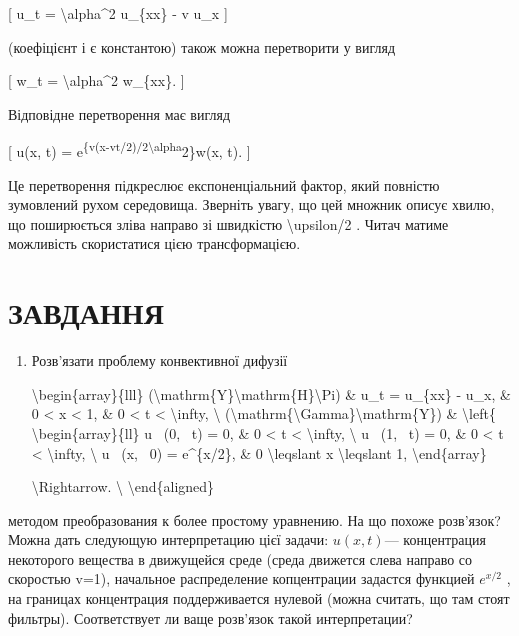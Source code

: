 \documentclass[
]{article}
\begin{document}
{[} u\_t = \textbackslash alpha\^{}2 u\_\{xx\} - v u\_x {]}

(коефіцієнт і є константою) також можна перетворити у вигляд

{[} w\_t = \textbackslash alpha\^{}2 w\_\{xx\}. {]}

Відповідне перетворення має вигляд

{[} u(x, t) =
e\textsuperscript{\{v(x-vt/2)/2\textbackslash alpha}2\}w(x, t). {]}

Це перетворення підкреслює експоненціальний фактор, який повністю
зумовлений рухом середовища. Зверніть увагу, що цей множник описує
хвилю, що поширюється зліва направо зі швидкістю
\textbackslash upsilon/2 . Читач матиме можливість скористатися цією
трансформацією.

\section{ЗАВДАННЯ}\label{ux437ux430ux432ux434ux430ux43dux43dux44f-5}

\begin{enumerate}
\def\labelenumi{\arabic{enumi}.}
\item
  Розв'язати проблему конвективної дифузії

  \textbackslash begin\{array\}\{lll\}
  (\textbackslash mathrm\{Y\}\textbackslash mathrm\{H\}\textbackslash Pi)
  \& u\_t = u\_\{xx\} - u\_x, \& 0 \textless{} x \textless{} 1, \& 0
  \textless{} t \textless{} \textbackslash infty, \textbackslash{}
  (\textbackslash mathrm\{\textbackslash Gamma\}\textbackslash mathrm\{Y\})
  \& \textbackslash left\{ \textbackslash begin\{array\}\{ll\} u ~(0,
  ~t) = 0, \& 0 \textless{} t \textless{} \textbackslash infty,
  \textbackslash{} u ~(1, ~t) = 0, \& 0 \textless{} t \textless{}
  \textbackslash infty, \textbackslash{} u ~(x, ~0) = e\^{}\{x/2\}, \& 0
  \textbackslash leqslant x \textbackslash leqslant 1,
  \textbackslash end\{array\}

  \textbackslash Rightarrow. \textbackslash{}
  \textbackslash end\{aligned\}
\end{enumerate}

методом преобразования к более простому уравнению. На що похоже
розв'язок? Можна дать следующую интерпретацию цієї задачи:
\(u(x, t)\)--- концентрация некоторого вещества в движущейся среде
(среда движется слева направо со скоростью v=1), начальное распределение
копцентрации задастся функцией \(e^{x/2}\) , на границах концентрация
поддерживается нулевой (можна считать, що там стоят фильтры).
Соответствует ли ваще розв'язок такой интерпретации?
\end{document}
